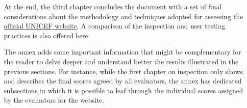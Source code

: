 At the end, the third chapter concludes the document with a set of final considerations about the methodology and techniques adopted for assessing the \href{https://www.unicef.org/}{official UNICEF website}. A comparison of the inspection and user testing practices is also offered here.

The annex adds some important information that might be complementary for the reader to delve deeper and understand better the results illustrated in the previous sections. For instance, while the first chapter on inspection only shows and describes the final scores agreed by all evaluators, the annex has dedicated subsections in which it is possible to leaf through the individual scores assigned by the evaluators for the website.
